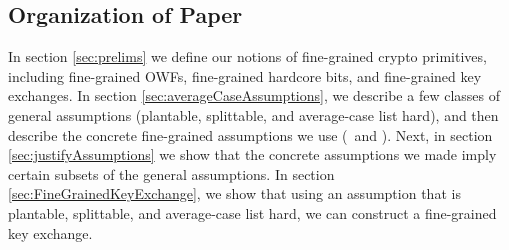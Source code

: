 




%



\subsection{Organization of Paper}

In section \ref{sec:prelims} we define our notions of fine-grained crypto primitives, including fine-grained OWFs, fine-grained hardcore bits, and  fine-grained key exchanges. In section \ref{sec:averageCaseAssumptions}, we describe a few classes of general assumptions (plantable, splittable, and average-case list hard), and then describe the concrete fine-grained assumptions we use (\kSum~and \zkclique). Next, in section \ref{sec:justifyAssumptions} we show that the concrete assumptions we made imply certain subsets of the general assumptions. 
In section \ref{sec:FineGrainedKeyExchange}, we show that using an assumption that is plantable, splittable, and average-case list hard, we can construct a fine-grained key exchange.

